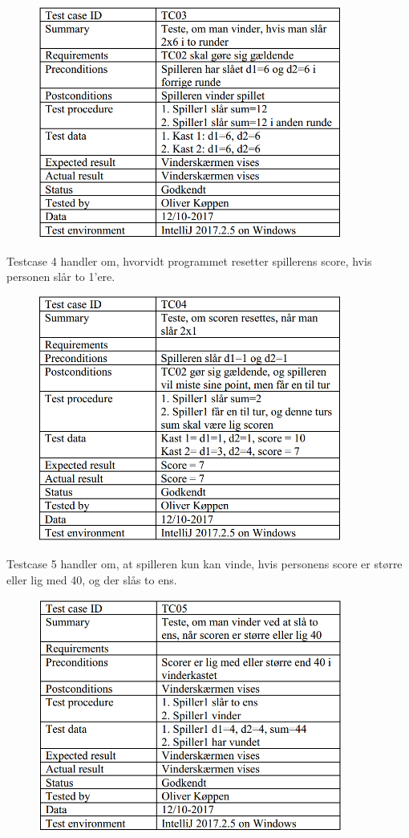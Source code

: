 \begin{figure}[h]
    \begin{center}
        \includegraphics[width=10cm]{graphics/TC03}
    \end{center}
\end{figure}

\noindent
Testcase 4 handler om, hvorvidt programmet resetter spillerens score, hvis personen slår to 1'ere.

\begin{figure}[h]
    \begin{center}
        \includegraphics[width=10cm]{graphics/TC04}
    \end{center}
\end{figure}

\pagebreak

\noindent
Testcase 5 handler om, at spilleren kun kan vinde, hvis personens score er større eller lig med 40, og der slås to ens.

\begin{figure}[h]
    \begin{center}
        \includegraphics[width=10cm]{graphics/TC05}
    \end{center}
\end{figure}